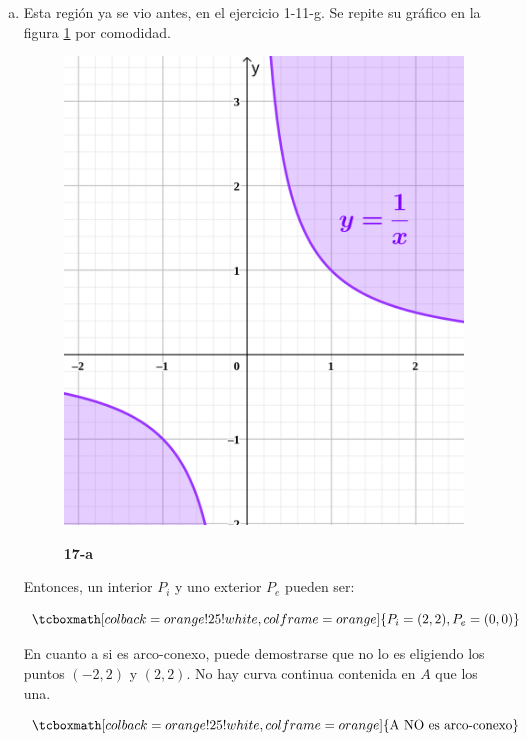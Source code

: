 \documentclass{article}
\begin{document}
\begin{enumerate}[(a)]
\item Esta región ya se vio antes, en el ejercicio 1-11-g. Se repite su gráfico en la figura \ref{fig:1-17-a} por comodidad.

\begin{figure}[ht]
\caption{\textbf{17-a}}
\includegraphics[scale=1]{img/ejercicios/1/11-g.png} 
\centering
\label{fig:1-17-a}
\end{figure}

Entonces, un interior $P_i$ y uno exterior $P_e$ pueden ser:

\begin{equation}
\tcboxmath[colback=orange!25!white,colframe=orange]
{
P_i = (2,2), P_e = (0, 0)
}
\end{equation}

En cuanto a si es arco-conexo, puede demostrarse que no lo es eligiendo los puntos $(-2,2)$ y $(2,2)$. No hay curva continua contenida en $A$ que los una.

\begin{equation}
\tcboxmath[colback=orange!25!white,colframe=orange]
{ \text{A NO es arco-conexo} }
\end{equation}


\end{enumerate}
\end{document}
